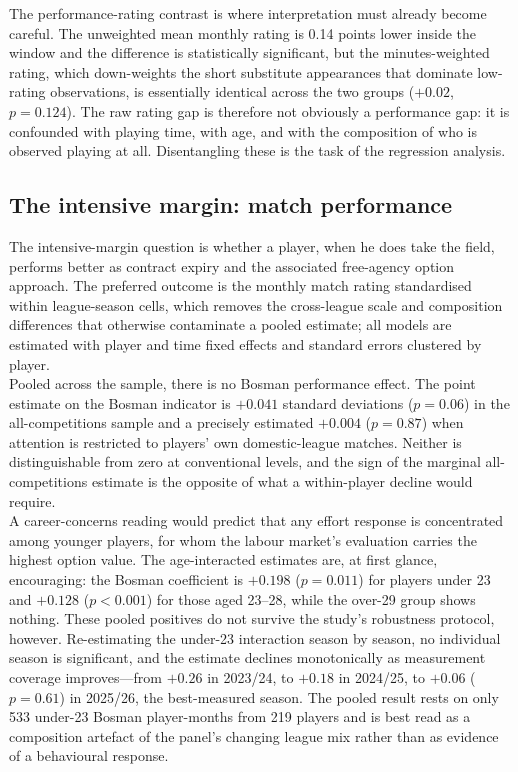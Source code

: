 \documentclass{article}
\begin{document}
The performance-rating contrast is where interpretation must already become
careful. The unweighted mean monthly rating is 0.14 points lower inside the
window and the difference is statistically significant, but the minutes-weighted
rating, which down-weights the short substitute appearances that dominate
low-rating observations, is essentially identical across the two groups
($+0.02$, $p = 0.124$). The raw rating gap is therefore not obviously a
performance gap: it is confounded with playing time, with age, and with the
composition of who is observed playing at all. Disentangling these is the task
of the regression analysis.



\subsection{The intensive margin: match performance}
\label{sec:results-intensive}

The intensive-margin question is whether a player, when he does take the field,
performs better as contract expiry and the associated free-agency option
approach. The preferred outcome is the monthly match rating standardised within
league-season cells, which removes the cross-league scale and composition
differences that otherwise contaminate a pooled estimate; all models are
estimated with player and time fixed effects and standard errors clustered by
player. \\

Pooled across the sample, there is no Bosman performance effect. The point
estimate on the Bosman indicator is $+0.041$ standard deviations ($p = 0.06$) in
the all-competitions sample and a precisely estimated $+0.004$ ($p = 0.87$) when
attention is restricted to players' own domestic-league matches. Neither is
distinguishable from zero at conventional levels, and the sign of the marginal
all-competitions estimate is the opposite of what a within-player decline would
require. \\

A career-concerns reading would predict that any effort response is concentrated
among younger players, for whom the labour market's evaluation carries the
highest option value. The age-interacted estimates are, at first glance,
encouraging: the Bosman coefficient is $+0.198$ ($p = 0.011$) for players under
23 and $+0.128$ ($p < 0.001$) for those aged 23--28, while the over-29 group
shows nothing. These pooled positives do not survive the study's robustness
protocol, however. Re-estimating the under-23 interaction season by season, no
individual season is significant, and the estimate declines monotonically as
measurement coverage improves---from $+0.26$ in 2023/24, to $+0.18$ in 2024/25,
to $+0.06$ ($p = 0.61$) in 2025/26, the best-measured season. The pooled result
rests on only 533 under-23 Bosman player-months from 219 players and is best
read as a composition artefact of the panel's changing league mix rather than as
evidence of a behavioural response. \\
\end{document}
